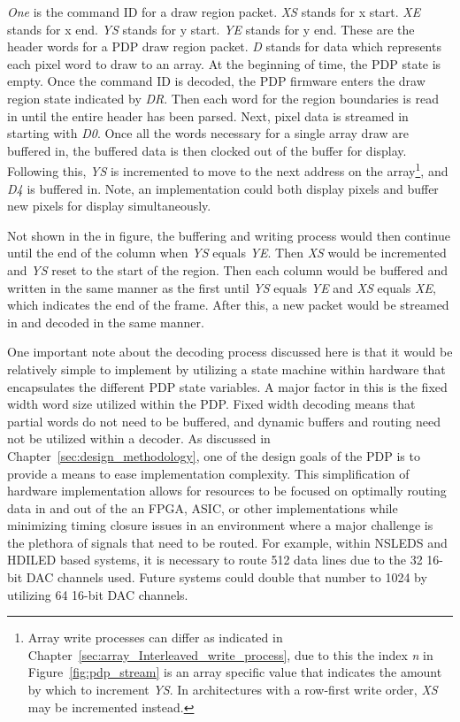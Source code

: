     {\it One} is the command ID for a draw region packet. {\it XS} stands for x start. {\it XE} stands for x end. {\it YS} stands for y start. {\it YE} stands for y end. These are the header words for a PDP draw region packet. {\it D} stands for data which represents each pixel word to draw to an array. At the beginning of time, the PDP state is empty. Once the command ID is decoded, the PDP firmware enters the draw region state indicated by {\it DR}. Then each word for the region boundaries is read in until the entire header has been parsed. Next, pixel data is streamed in starting with {\it D0}. Once all the words necessary for a single array draw are buffered in, the buffered data is then clocked out of the buffer for display. Following this, {\it YS} is incremented to move to the next address on the array\footnote{Array write processes can differ as indicated in Chapter~\ref{sec:array_Interleaved_write_process}, due to this the index {\it n} in Figure~\ref{fig:pdp_stream} is an array specific value that indicates the amount by which to increment {\it YS}. In architectures with a row-first write order, {\it XS} may be incremented instead.}, and {\it D4} is buffered in. Note, an implementation could both display pixels and buffer new pixels for display simultaneously.

    Not shown in the in figure, the buffering and writing process would then continue until the end of the column when {\it YS} equals {\it YE}. Then {\it XS} would be incremented and {\it YS} reset to the start of the region. Then each column would be buffered and written in the same manner as the first until {\it YS} equals {\it YE} and {\it XS} equals {\it XE}, which indicates the end of the frame. After this, a new packet would be streamed in and decoded in the same manner.

    One important note about the decoding process discussed here is that it would be relatively simple to implement by utilizing a state machine within hardware that encapsulates the different PDP state variables. A major factor in this is the fixed width word size utilized within the PDP. Fixed width decoding means that partial words do not need to be buffered, and dynamic buffers and routing need not be utilized within a decoder. As discussed in Chapter~\ref{sec:design_methodology}, one of the design goals of the PDP is to provide a means to ease implementation complexity. This simplification of hardware implementation allows for resources to be focused on optimally routing data in and out of the an FPGA, ASIC, or other implementations while minimizing timing closure issues in an environment where a major challenge is the plethora of signals that need to be routed. For example, within NSLEDS and HDILED based systems, it is necessary to route 512 data lines due to the 32 16-bit DAC channels used. Future systems could double that number to 1024 by utilizing 64 16-bit DAC channels.

